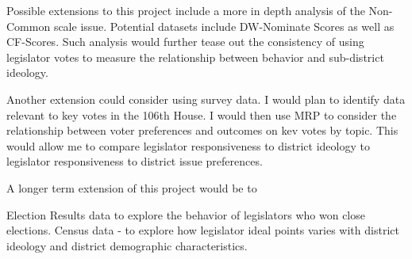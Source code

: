 \documentclass[10pt,letterpaper]{article}
\begin{document}
Possible extensions to this project include a more in depth analysis of the Non-Common scale issue. Potential datasets include DW-Nominate Scores as well as CF-Scores. Such analysis would further tease out the consistency of using legislator votes to measure the relationship between behavior and sub-district ideology.

Another extension could consider using survey data. I would plan to identify data relevant to key votes in the 106th House. I would then use MRP to consider the relationship between voter preferences and outcomes on kev votes by topic. This would allow me to compare legislator responsiveness to district ideology to legislator responsiveness to district issue preferences.


A longer term extension of this project would be to 

Election Results data to explore the behavior of legislators who won close elections.
Census data - to explore how legislator ideal points varies with district ideology and district demographic characteristics. 






\newpage

\newpage


\end{document}
